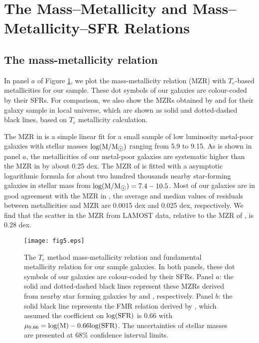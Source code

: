 \documentclass[usenatbib]{raa}
\begin{document}
\section{The Mass--Metallicity and Mass--Metallicity--SFR Relations}
\label{mz_fmr}

\subsection{The mass-metallicity relation}
\label{mz-rela}
In panel $a$ of Figure \ref{fmr_rela}, we plot the mass-metallicity relation (MZR)
with  $T_e$-based metallicities for our sample. These dot 
symbols of our galaxies are colour-coded by their SFRs.
For comparison,
we also show the MZRs obtained by \cite{2013ApJ...765..140A} and 
\cite{2012ApJ...754...98B} for their galaxy sample in local universe,
which are shown as solid and dotted-dashed black lines, based on
$T_e$ metallicity calculation.  
 
The MZR in \cite{2012ApJ...754...98B} is a simple linear fit for a small sample 
of low luminosity metal-poor galaxies with stellar masses $\rm log(M/M_{\hbox{$\odot$}})$
ranging from 5.9 to 9.15. As is shown in panel $a$, the metallicities of 
our 
metal-poor galaxies are systematic higher than the MZR in
\cite{2012ApJ...754...98B} by about 0.25 dex. The MZR of
\cite{2013ApJ...765..140A} is fitted with a asymptotic logarithmic
formula for about two hundred thousands 
nearby star-forming galaxies in stellar mass from $\rm log(M/M_{\hbox{$\odot$}})=7.4\--10.5$.
Most of our galaxies are in good agreement
with the MZR in \cite{2013ApJ...765..140A},  the 
average and median values of residuals between metallicities and MZR are 
0.0015 dex and 0.025 dex, respectively. 
 We find that the scatter in the MZR from LAMOST 
data, relative to the MZR of \cite{2013ApJ...765..140A}, is 0.28 dex.  


\begin{figure}[h]
\center
\texttt{[image: fig5.eps]}
\caption{The $T_e$ method mass-metallicity relation and fundamental
metallicity relation for our sample galaxies. In both panels, these dot 
symbols of our galaxies are colour-coded by their SFRs. Panel $a$: the solid and
dotted-dashed black lines represent these MZRs
derived from nearby star forming galaxies by \cite{2013ApJ...765..140A} and
\cite{2012ApJ...754...98B}, respectively.
 Panel
$b$: the solid black line represents the FMR relation derived by
\cite{2013ApJ...765..140A}, which assumed the coefficient on $\rm log(SFR)$
is 0.66 with $\rm \mu_{0.66} = log(M) - 0.66 log(SFR)$. The uncertainties 
of stellar masses are presented at 68$\%$ confidence interval limits.} 
 
\label{fmr_rela}
\end{figure}
\end{document}
